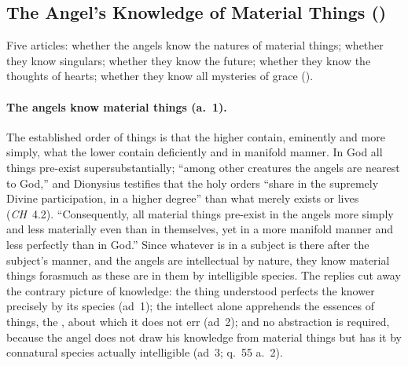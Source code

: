\subsection{The Angel's Knowledge of Material Things ()}\label{sec:q57}

Five articles: whether the angels know the natures of material things;
whether they know singulars; whether they know the future; whether they
know the thoughts of hearts; whether they know all mysteries of grace
().

\paragraph{The angels know material things (a.~1).} The established order
of things is that the higher contain, eminently and more simply, what the
lower contain deficiently and in manifold manner. In God all things
pre-exist supersubstantially; ``among other creatures the angels are
nearest to God,'' and Dionysius testifies that the holy orders ``share in
the supremely Divine participation, in a higher degree'' than what merely
exists or lives (\emph{CH}~4.2). ``Consequently, all material things
pre-exist in the angels more simply and less materially even than in
themselves, yet in a more manifold manner and less perfectly than in
God.'' Since whatever is in a subject is there after the subject's manner,
and the angels are intellectual by nature, they know material things
forasmuch as these are in them by intelligible species. The replies cut
away the contrary picture of knowledge: the thing understood perfects the
knower precisely by its species (ad~1); the intellect alone apprehends the
essences of things, the , about which it does not err
(ad~2); and no abstraction is required, because the angel does not draw
his knowledge from material things but has it by connatural species
actually intelligible (ad~3; q.~55 a.~2).

